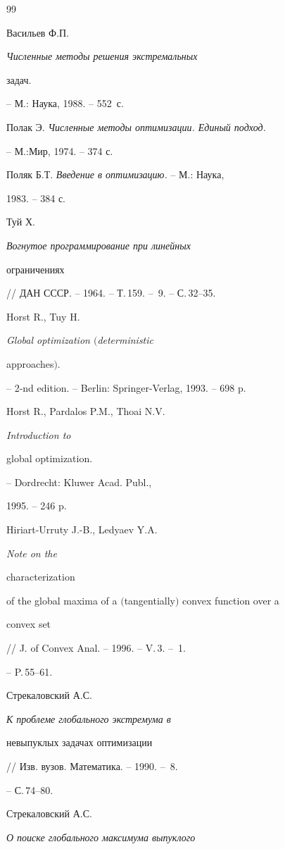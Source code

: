 \begin{thebibliography}{99}




Васильев Ф.П. {\em Численные методы решения экстремальных


задач.} -- М.: Наука, 1988. -- 552~с.




Полак Э. {\em Численные методы оптимизации. Единый подход.}


-- М.:Мир, 1974. -- 374 с.




Поляк Б.Т. {\em Введение в оптимизацию.} -- М.: Наука,


1983. -- 384 с.




Туй Х. {\em Вогнутое программирование при линейных


ограничениях} // ДАН СССР. -- 1964. -- Т.\,159. -- \No\,9. -- С.\,32--35.




Horst R., Tuy H. {\em Global optimization $($deterministic 


approaches$)$.} -- 2-nd edition. -- Berlin: Springer-Verlag, 1993. -- 698 p.




Horst R., Pardalos P.M., Thoai N.V. {\em Introduction to


global optimization.} -- Dordrecht: Kluwer Acad. Publ.,


1995. -- 246 p.




Hiriart-Urruty J.-B., Ledyaev Y.A. {\em Note on the


characterization


of the global maxima of a $($tangentially$)$ convex function over a 


convex set} // J. of Convex Anal. -- 1996. -- V.\,3. -- \No\,1.


-- P.\,55--61.




Стрекаловский А.С. {\em К проблеме глобального экстремума в 


невыпуклых задачах оптимизации} // Изв. вузов. Математика. -- 1990. -- \No\,8.


-- С.\,74--80.




Стрекаловский А.С. {\em О поиске глобального максимума выпуклого


}
\end{thebibliography}
